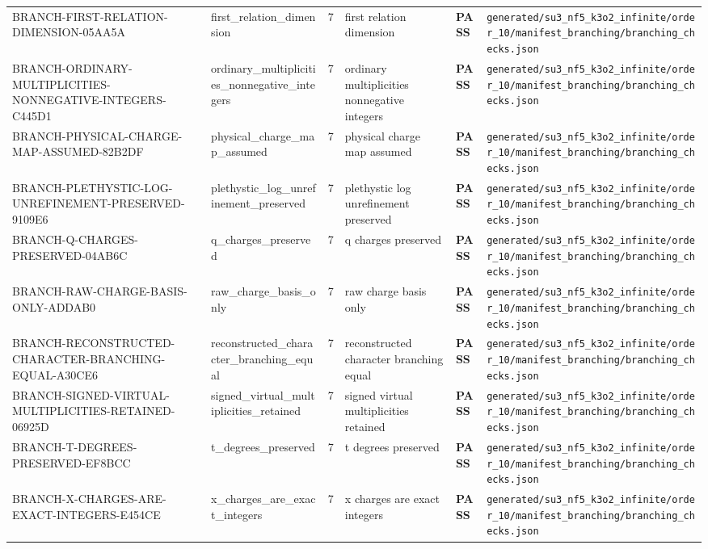 \documentclass[11pt]{article}
\newcommand{\Pass}{\textcolor{green!50!black}{\textbf{PASS}}}
\newcommand{\RawPath}[1]{\texttt{#1}}
\begin{document}
\begin{longtable}{p{3cm}p{2.5cm}r p{3cm}l p{2cm}}
BRANCH-FIRST-RELATION-DIMENSION-05AA5A & first\_relation\_dimension & 7 & first relation dimension & \Pass & \RawPath{generated/su3\_nf5\_k3o2\_infinite/order\_10/manifest\_branching/branching\_checks.json}\\
BRANCH-ORDINARY-MULTIPLICITIES-NONNEGATIVE-INTEGERS-C445D1 & ordinary\_multiplicities\_nonnegative\_integers & 7 & ordinary multiplicities nonnegative integers & \Pass & \RawPath{generated/su3\_nf5\_k3o2\_infinite/order\_10/manifest\_branching/branching\_checks.json}\\
BRANCH-PHYSICAL-CHARGE-MAP-ASSUMED-82B2DF & physical\_charge\_map\_assumed & 7 & physical charge map assumed & \Pass & \RawPath{generated/su3\_nf5\_k3o2\_infinite/order\_10/manifest\_branching/branching\_checks.json}\\
BRANCH-PLETHYSTIC-LOG-UNREFINEMENT-PRESERVED-9109E6 & plethystic\_log\_unrefinement\_preserved & 7 & plethystic log unrefinement preserved & \Pass & \RawPath{generated/su3\_nf5\_k3o2\_infinite/order\_10/manifest\_branching/branching\_checks.json}\\
BRANCH-Q-CHARGES-PRESERVED-04AB6C & q\_charges\_preserved & 7 & q charges preserved & \Pass & \RawPath{generated/su3\_nf5\_k3o2\_infinite/order\_10/manifest\_branching/branching\_checks.json}\\
BRANCH-RAW-CHARGE-BASIS-ONLY-ADDAB0 & raw\_charge\_basis\_only & 7 & raw charge basis only & \Pass & \RawPath{generated/su3\_nf5\_k3o2\_infinite/order\_10/manifest\_branching/branching\_checks.json}\\
BRANCH-RECONSTRUCTED-CHARACTER-BRANCHING-EQUAL-A30CE6 & reconstructed\_character\_branching\_equal & 7 & reconstructed character branching equal & \Pass & \RawPath{generated/su3\_nf5\_k3o2\_infinite/order\_10/manifest\_branching/branching\_checks.json}\\
BRANCH-SIGNED-VIRTUAL-MULTIPLICITIES-RETAINED-06925D & signed\_virtual\_multiplicities\_retained & 7 & signed virtual multiplicities retained & \Pass & \RawPath{generated/su3\_nf5\_k3o2\_infinite/order\_10/manifest\_branching/branching\_checks.json}\\
BRANCH-T-DEGREES-PRESERVED-EF8BCC & t\_degrees\_preserved & 7 & t degrees preserved & \Pass & \RawPath{generated/su3\_nf5\_k3o2\_infinite/order\_10/manifest\_branching/branching\_checks.json}\\
BRANCH-X-CHARGES-ARE-EXACT-INTEGERS-E454CE & x\_charges\_are\_exact\_integers & 7 & x charges are exact integers & \Pass & \RawPath{generated/su3\_nf5\_k3o2\_infinite/order\_10/manifest\_branching/branching\_checks.json}\\

\end{longtable}
\end{document}
